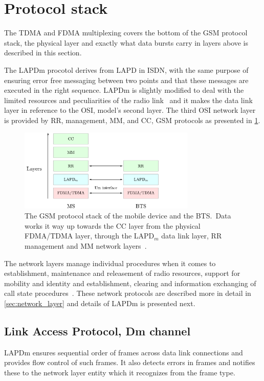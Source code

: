 \section{Protocol stack}
\label{sec:protocol_stack}
The \gls{TDMA} and \gls{FDMA} multiplexing covers the bottom of the
\gls{GSM} protocol stack, the physical layer and exactly what data
bursts carry in layers above is described in this section.

The \gls{LAPDm} procotol derives from \gls{LAPD} in \gls{ISDN}, with
the same purpose of ensuring error free messaging between two points
and that these messages are executed in the right
sequence. \gls{LAPDm} is slightly modified to deal with the limited
resources and peculiarities of the radio
link~\cite[p. 101--102]{gsmnetworks} and it makes the data link layer
in reference to the \gls{OSI}, model's second layer. The third
\gls{OSI} network layer is provided by \gls{RR}, management, \gls{MM},
and \gls{CC}, \gls{GSM} protocols as presented in
\cref{fig:protocol_stack}.
\begin{figure}[H]
  \centering
  \includegraphics[width=0.75\textwidth]{figures/protocol_stack}
  \caption{The \gls{GSM} protocol stack of the mobile device and the
    \gls{BTS}.\ Data works it way up towards the CC layer from
    the physical FDMA/TDMA layer, through the LAPD$_m$
    data link layer, RR management and MM network
    layers~\cite[p. 108]{gsmnetworks}.}
  \label{fig:protocol_stack}
\end{figure}
The network layers manage individual procedures when it comes to
establishment, maintenance and releasement of radio resources, support
for mobility and identity and establishment, clearing and information
exchanging of call state procedures~\cite[p. 37--38, 91--92,
  176]{layer32}. These network protocols are described more in detail
in \cref{sec:network_layer} and details of \gls{LAPDm} is presented
next.

\subsection{Link Access Protocol, Dm channel}
\gls{LAPDm} ensures sequential order of frames across data link
connections and provides flow control of such frames. It also
detects errors in frames and notifies these to the network layer
entity which it recognizes from the frame type.

